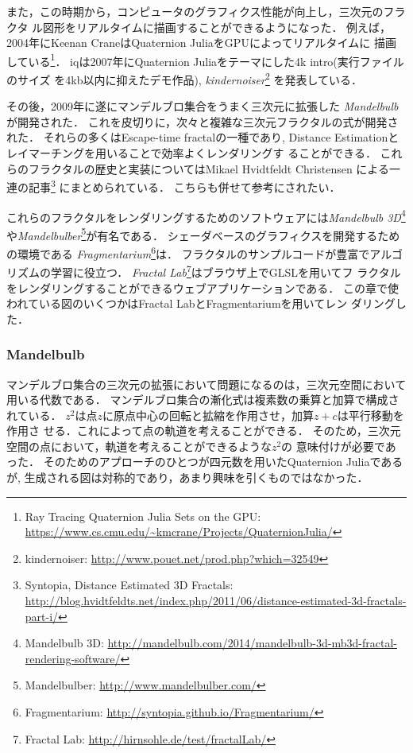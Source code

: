 また，この時期から，コンピュータのグラフィクス性能が向上し，三次元のフラクタ
ル図形をリアルタイムに描画することができるようになった．
例えば，2004年にKeenan CraneはQuaternion JuliaをGPUによってリアルタイムに
描画している\footnote{Ray Tracing Quaternion Julia Sets on
the GPU:
\url{https://www.cs.cmu.edu/~kmcrane/Projects/QuaternionJulia/}}．
iqは2007年にQuaternion Juliaをテーマにした4k intro(実行ファイルのサイズ
を4kb以内に抑えたデモ作品),
\textit{kindernoiser}\footnote{kindernoiser: \url{http://www.pouet.net/prod.php?which=32549}}
を発表している．

その後，2009年に遂にマンデルブロ集合をうまく三次元に拡張した
\textit{Mandelbulb}が開発された．
これを皮切りに，次々と複雑な三次元フラクタルの式が開発された．
それらの多くはEscape-time fractalの一種であり,
Distance Estimationとレイマーチングを用いることで効率よくレンダリングす
ることができる．
これらのフラクタルの歴史と実装についてはMikael Hvidtfeldt Christensen
による一連の記事\footnote{Syntopia, Distance Estimated 3D
Fractals:\\ \quad \quad
\url{http://blog.hvidtfeldts.net/index.php/2011/06/distance-estimated-3d-fractals-part-i/}}
にまとめられている．
こちらも併せて参考にされたい．

これらのフラクタルをレンダリングするためのソフトウェアには\textit{Mandelbulb
3D}\footnote{Mandelbulb 3D:
\url{http://mandelbulb.com/2014/mandelbulb-3d-mb3d-fractal-rendering-software/}}
や\textit{Mandelbulber}\footnote{Mandelbulber:
\url{http://www.mandelbulber.com/}}が有名である．
シェーダベースのグラフィクスを開発するための環境である
\textit{Fragmentarium}\footnote{Fragmentarium:
\url{http://syntopia.github.io/Fragmentarium/}}は．
フラクタルのサンプルコードが豊富でアルゴリズムの学習に役立つ．
\textit{Fractal Lab}\footnote{Fractal Lab:
\url{http://hirnsohle.de/test/fractalLab/}}はブラウザ上でGLSLを用いてフ
ラクタルをレンダリングすることができるウェブアプリケーションである．
この章で使われている図のいくつかはFractal LabとFragmentariumを用いてレン
ダリングした．

\subsubsection{Mandelbulb}

マンデルブロ集合の三次元の拡張において問題になるのは，三次元空間において
用いる代数である．
マンデルブロ集合の漸化式は複素数の乗算と加算で構成されている．
$z^2$は点$z$に原点中心の回転と拡縮を作用させ，加算$z + c$は平行移動を作用さ
せる．これによって点の軌道を考えることができる．
そのため，三次元空間の点において，軌道を考えることができるような$z^2$の
意味付けが必要であった．
そのためのアプローチのひとつが四元数を用いたQuaternion Juliaであるが,
生成される図は対称的であり，あまり興味を引くものではなかった．

